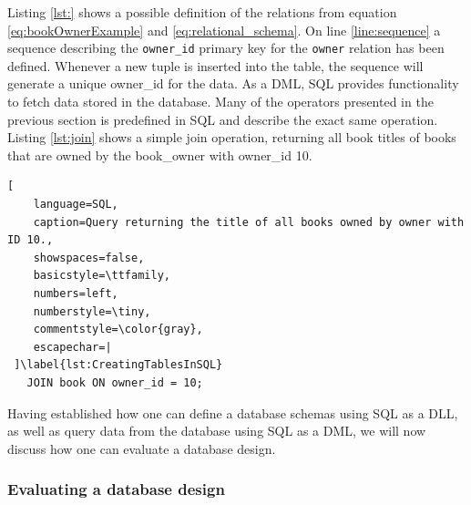 Listing \ref{lst:} shows a possible definition of the relations from equation \ref{eq:bookOwnerExample} and \ref{eq:relational_schema}.
On line \ref{line:sequence} a sequence describing the \texttt{owner\_id} primary key for the \texttt{owner} relation has been defined.
Whenever a new tuple is inserted into the table, the sequence will generate a unique owner\_id for the data.
As a DML, SQL provides functionality to fetch data stored in the database. 
Many of the operators presented in the previous section is predefined in SQL and describe the exact same operation. 
Listing \ref{lst:join} shows a simple join operation, returning all book titles of books that are owned by the book\_owner with owner\_id 10.
\begin{lstlisting}[
    language=SQL,
    caption=Query returning the title of all books owned by owner with ID 10.,
    showspaces=false,
    basicstyle=\ttfamily,
    numbers=left,
    numberstyle=\tiny,
    commentstyle=\color{gray},
    escapechar=|
 ]\label{lst:CreatingTablesInSQL}
   JOIN book ON owner_id = 10;
\end{lstlisting}

Having established how one can define a database schemas using SQL as a DLL, as well as query data from the database using SQL as a DML, we will now discuss how one can evaluate a database design.
\subsubsection*{Evaluating a database design}

